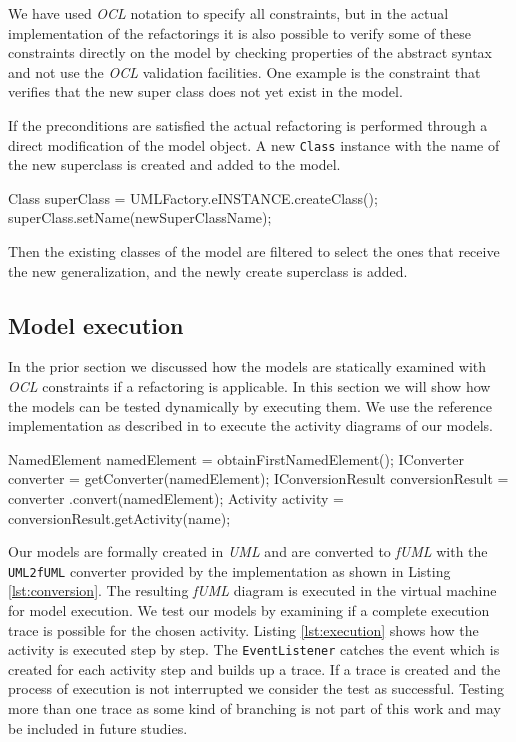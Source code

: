 \documentclass{llncs}
\begin{document}
We have used \textit{OCL} notation to specify all constraints, but in the actual implementation of the refactorings it
is also possible to verify some of these constraints directly on the model by checking properties of the abstract syntax
and not use the \textit{OCL} validation facilities. One example is the constraint that verifies that the new super class does not
yet exist in the model.

If the preconditions are satisfied the actual refactoring is performed through a direct modification of the model object.
A new \texttt{Class} instance with the name of the new superclass is created and added to the model. 

\begin{lstsingle}[language=Java,caption=UML element creation,label=lst:createclass]
Class superClass = UMLFactory.eINSTANCE.createClass();
superClass.setName(newSuperClassName);
\end{lstsingle}


Then the existing
classes of the model are filtered to select the ones that receive the new generalization, and the newly create superclass
is added.

\subsection{Model execution}
\label{sec:execution}
In the prior section we discussed how the models are statically examined with \textit{OCL} constraints if a refactoring 
is applicable. In this section we will show how the models can be tested dynamically by executing them. We use the 
reference implementation as described in \cite{DBLP:conf/models/MayerhoferLK12} to execute the activity diagrams of 
our models.

\begin{lstsingle}[language=Java,caption=Converting the UML diagram to fUML,label=lst:conversion]
NamedElement namedElement = obtainFirstNamedElement();
IConverter converter = getConverter(namedElement);
IConversionResult conversionResult = converter
  .convert(namedElement);
Activity activity = conversionResult.getActivity(name);
\end{lstsingle}

Our models are formally created in \textit{UML} and are converted to \textit{fUML} with the \texttt{UML2fUML} converter 
provided by the implementation as shown in Listing \ref{lst:conversion}. The resulting \textit{fUML} diagram is executed in the 
virtual machine for model execution. 
We test our models by examining if a complete execution trace is possible for the chosen activity. Listing \ref{lst:execution} 
shows how the activity is executed step by step. The \texttt{EventListener} catches the event which is created for each 
activity step and builds up a trace. If a trace is created and the process of execution is not interrupted we consider the 
test as successful. Testing more than one trace as some kind of branching is not part of this work and may be included in future studies.
\end{document}
